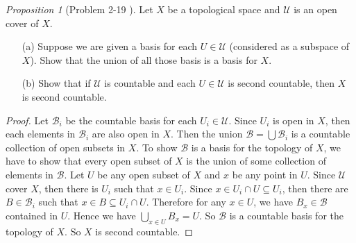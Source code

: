 \documentclass[a4paper]{article}
\theoremstyle{remark}
\newtheorem{prop}{Proposition}
\newcommand{\subhim}{\subseteq} %
\begin{document}
\begin{prop}[Problem 2-19 \cite{LeeTM}]
	Let $X$ be a topological space and $\mathcal{U}$ is an open cover of $X$. 
	\begin{enumerate}[nolistsep]
		\item [(a)] Suppose we are given a basis for each $U \in \mathcal{U}$ (considered as a subspace of $X$). Show that the union of all those basis is a basis for $X$.
		\item [(b)] Show that if $\mathcal{U}$  is countable and each $U \in \mathcal{U}$ is second countable, then $X$ is second countable.
	\end{enumerate}
\end{prop}
\begin{proof}
	Let $\mathcal{B}_i$ be the countable basis for each $U_i \in \mathcal{U}$. Since $U_i$ is open in $X$, then each elements in $\mathcal{B}_i$ are also open in $X$. Then the union $\mathcal{B} = \bigcup \mathcal{B}_i$ is a countable collection of open subsets in $X$. To show $\mathcal{B}$ is a basis for the topology of $X$, we have to show that every open subset of $X$ is the union of some collection of elements in $\mathcal{B}$. Let $U$ be any open subset of $X$ and $x$ be any point in $U$. Since $\mathcal{U}$ cover $X$, then there is $U_i$ such that $x \in U_i$. Since $x \in U_i \cap U \subhim U_i$, then there are $B \in \mathcal{B}_i$ such that $x \in B \subhim U_i \cap U$. Therefore for any $x \in U$, we have $B_x \in \mathcal{B}$ contained in $U$. Hence we have $\bigcup_{x\in U}B_x = U$. So $\mathcal{B}$ is a countable basis for the topology of $X$. So $X$ is second  countable.
\end{proof}
\end{document}
